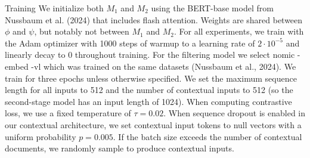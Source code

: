 Training We initialize both \(M_{1}\) and \(M_{2}\) using the BERT-base model from Nussbaum et al. (2024) that includes flash attention. Weights are shared between \(\phi\) and \(\psi\), but notably not between \(M_{1}\) and \(M_{2}\). For all experiments, we train with the Adam optimizer with 1000 steps of warmup to a learning rate of \(2 \cdot 10^{-5}\) and linearly decay to 0 throughout training. For the filtering model we select nomic -embed -vl which was trained on the same datasets (Nussbaum et al., 2024). We train for three epochs unless otherwise specified. We set the maximum sequence length for all inputs to 512 and the number of contextual inputs to 512 (so the second-stage model has an input length of 1024). When computing contrastive loss, we use a fixed temperature of \(\tau=0.02\). When sequence dropout is enabled in our contextual architecture, we set contextual input tokens to null vectors with a uniform probability \(p=0.005\). If the batch size exceeds the number of contextual documents, we randomly sample to produce contextual inputs.

